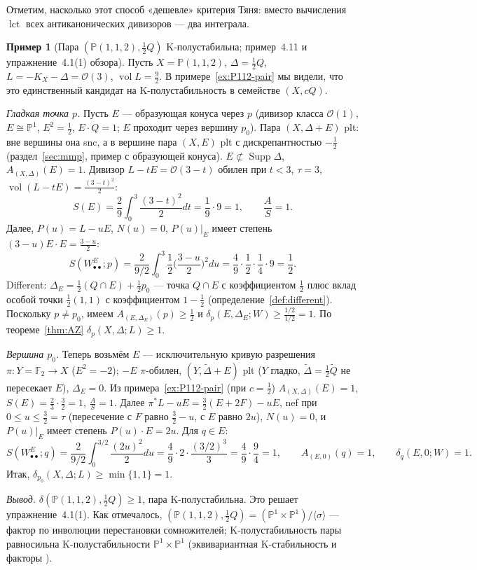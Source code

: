 \documentclass[11pt,a4paper]{article}
\theoremstyle{plain}
\theoremstyle{definition}
\newtheorem{example}[theorem]{Пример}
\theoremstyle{remark}
\newcommand{\PP}{\mathbb{P}}
\newcommand{\cO}{\mathcal{O}}
\DeclareMathOperator{\vol}{vol}
\DeclareMathOperator{\lct}{lct}
\DeclareMathOperator{\Supp}{Supp}
\begin{document}
Отметим, насколько этот способ «дешевле» критерия Тяня: вместо вычисления $\lct$ всех
антиканонических дивизоров --- два интеграла.

\begin{example}[Пара $(\PP(1,1,2),\frac12Q)$ K-полустабильна; пример~4.11 и упражнение~4.1(1) обзора]\label{ex:AZ-P112}
Пусть $X=\PP(1,1,2)$, $\Delta=\frac12Q$, $L=-K_X-\Delta=\cO(3)$, $\vol L=\frac92$. В
примере~\ref{ex:P112-pair} мы видели, что это единственный кандидат на K-полустабильность в семействе
$(X,cQ)$.

\emph{Гладкая точка $p$.} Пусть $E$ --- образующая конуса через $p$ (дивизор класса $\cO(1)$,
$E\cong\PP^1$, $E^2=\frac12$, $E\cdot Q=1$; $E$ проходит через вершину $p_0$). Пара
$(X,\Delta+E)$ plt: вне вершины она snc, а в вершине пара $(X,E)$ plt с дискрепантностью
$-\frac12$ (раздел~\ref{sec:mmp}, пример с образующей конуса). $E\not\subset\Supp\Delta$,
$A_{(X,\Delta)}(E)=1$. Дивизор $L-tE=\cO(3-t)$ обилен при
$t<3$, $\tau=3$, $\vol(L-tE)=\frac{(3-t)^2}2$:
\[
S(E)=\frac29\int_0^3\frac{(3-t)^2}2dt=\frac19\cdot9=1,\qquad\frac{A}{S}=1 .
\]
Далее, $P(u)=L-uE$, $N(u)=0$, $P(u)|_E$ имеет степень $(3-u)E\cdot E=\frac{3-u}2$:
\[
S(W^E_{\bullet\bullet};p)=\frac2{9/2}\int_0^3\frac12\Big(\frac{3-u}2\Big)^2du=\frac49\cdot\frac12\cdot\frac14\cdot9=\frac12 .
\]
Different: $\Delta_E=\frac12(Q\cap E)+\frac12p_0$ --- точка $Q\cap E$ с коэффициентом $\frac12$
плюс вклад особой точки $\frac12(1,1)$ с коэффициентом $1-\frac12$ (определение~\ref{def:different}).
Поскольку $p\ne p_0$, имеем $A_{(E,\Delta_E)}(p)\ge\frac12$ и $\delta_p(E,\Delta_E;W)\ge\frac{1/2}{1/2}=1$. По
теореме~\ref{thm:AZ} $\delta_p(X,\Delta;L)\ge1$.

\emph{Вершина $p_0$.} Теперь возьмём $E$ --- исключительную кривую разрешения
$\pi\colon Y=\mathbb F_2\to X$ ($E^2=-2$); $-E$ $\pi$-обилен, $(Y,\tilde\Delta+E)$ plt ($Y$ гладко,
$\tilde\Delta=\frac12\tilde Q$ не пересекает $E$), $\Delta_E=0$. Из примера~\ref{ex:P112-pair} (при
$c=\frac12$) $A_{(X,\Delta)}(E)=1$, $S(E)=\frac23\cdot\frac32=1$, $\frac AS=1$. Далее
$\pi^*L-uE=\frac32(E+2F)-uE$, nef при $0\le u\le\frac32=\tau$ (пересечение с $F$ равно $\frac32-u$,
с $E$ равно $2u$), $N(u)=0$, и $P(u)|_E$ имеет степень $P(u)\cdot E=2u$. Для $q\in E$:
\[
S(W^E_{\bullet\bullet};q)=\frac2{9/2}\int_0^{3/2}\frac{(2u)^2}2du=\frac49\cdot2\cdot\frac{(3/2)^3}3=\frac49\cdot\frac94=1,
\qquad A_{(E,0)}(q)=1,\qquad\delta_q(E,0;W)=1 .
\]
Итак, $\delta_{p_0}(X,\Delta;L)\ge\min\{1,1\}=1$.

\emph{Вывод.} $\delta(\PP(1,1,2),\tfrac12Q)\ge1$, пара K-полустабильна. Это решает упражнение~4.1(1).
Как отмечалось, $(\PP(1,1,2),\frac12Q)=(\PP^1\times\PP^1)/\langle\sigma\rangle$ --- фактор по
инволюции перестановки сомножителей; K-полустабильность пары равносильна K-полустабильности
$\PP^1\times\PP^1$ (эквивариантная K-стабильность и факторы \cite{LZ22}).
\end{example}
\end{document}
